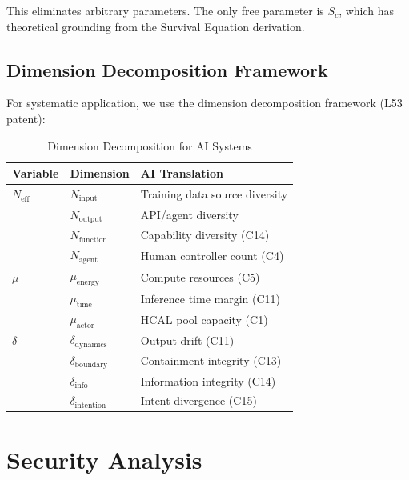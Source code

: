 \documentclass[11pt,a4paper]{article}
\newcommand{\Neff}{N_{\text{eff}}}
\begin{document}
This eliminates arbitrary parameters.
The only free parameter is $S_c$, which has theoretical grounding from the Survival Equation derivation.

\subsection{Dimension Decomposition Framework}

For systematic application, we use the dimension decomposition framework (L53 patent):

\begin{table}[htbp]
\centering
\caption{Dimension Decomposition for AI Systems}
\label{tab:dimensions}
\begin{tabular}{@{}lll@{}}
\toprule
Variable & Dimension & AI Translation \\
\midrule
$\Neff$ & $N_{\text{input}}$ & Training data source diversity \\
        & $N_{\text{output}}$ & API/agent diversity \\
        & $N_{\text{function}}$ & Capability diversity (C14) \\
        & $N_{\text{agent}}$ & Human controller count (C4) \\
\midrule
$\mu$   & $\mu_{\text{energy}}$ & Compute resources (C5) \\
        & $\mu_{\text{time}}$ & Inference time margin (C11) \\
        & $\mu_{\text{actor}}$ & HCAL pool capacity (C1) \\
\midrule
$\delta$ & $\delta_{\text{dynamics}}$ & Output drift (C11) \\
         & $\delta_{\text{boundary}}$ & Containment integrity (C13) \\
         & $\delta_{\text{info}}$ & Information integrity (C14) \\
         & $\delta_{\text{intention}}$ & Intent divergence (C15) \\
\bottomrule
\end{tabular}
\end{table}

\section{Security Analysis}
\label{sec:security}
\end{document}
